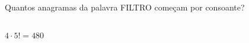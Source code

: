 \begin{ex}
 Quantos anagramas da palavra FILTRO começam por consoante?
   \begin{sol}
    \phantom{A} \\
    $4\cdot5!=480$
   \end{sol}
\end{ex}